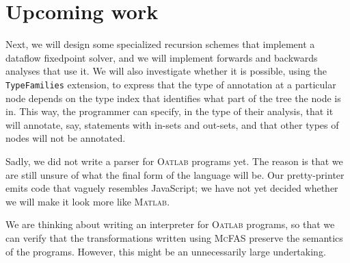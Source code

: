 \documentclass[letterpaper,11pt]{article}
\newcommand{\mcfas}{\textsc{McFAS}}
\newcommand{\matlab}{\textsc{Matlab}}
\newcommand{\oatlab}{\textsc{Oatlab}}
\newcommand{\codesnip}{\texttt}
\begin{document}

\section{Upcoming work}

Next, we will design some specialized recursion schemes that implement a
dataflow fixedpoint solver, and we will implement forwards and backwards
analyses that use it. We will also investigate whether it is possible, using
the \codesnip{TypeFamilies} extension, to express that the type of annotation
at a particular node depends on the type index that identifies what part of the
tree the node is in. This way, the programmer can specify, in the type of their
analysis, that it will annotate, say, statements with in-sets and out-sets, and
that other types of nodes will not be annotated.

Sadly, we did not write a parser for \oatlab{} programs yet. The reason is that
we are still unsure of what the final form of the language will be. Our
pretty-printer emits code that vaguely resembles JavaScript; we have not yet
decided whether we will make it look more like \matlab{}.

We are thinking about writing an interpreter for \oatlab{} programs, so that we
can verify that the transformations written using \mcfas{} preserve the
semantics of the programs. However, this might be an unnecessarily large
undertaking.
\end{document}

